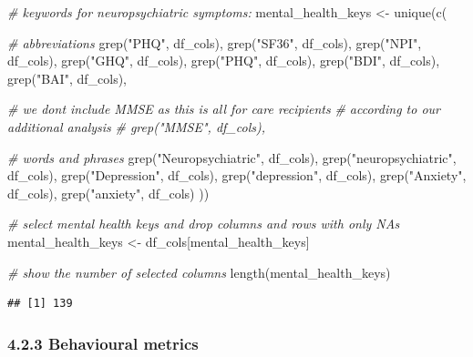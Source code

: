 \documentclass[
]{article}
\newenvironment{Shaded}{\begin{snugshade}}{\end{snugshade}}
\newcommand{\CommentTok}[1]{\textcolor[rgb]{0.56,0.35,0.01}{\textit{#1}}}
\newcommand{\FunctionTok}[1]{\textcolor[rgb]{0.00,0.00,0.00}{#1}}
\newcommand{\NormalTok}[1]{#1}
\newcommand{\OtherTok}[1]{\textcolor[rgb]{0.56,0.35,0.01}{#1}}
\newcommand{\StringTok}[1]{\textcolor[rgb]{0.31,0.60,0.02}{#1}}
\begin{document}
\begin{Shaded}
\begin{Highlighting}[]
\CommentTok{\# keywords for neuropsychiatric symptoms:}
\NormalTok{mental\_health\_keys }\OtherTok{\textless{}{-}} \FunctionTok{unique}\NormalTok{(}\FunctionTok{c}\NormalTok{(}

    \CommentTok{\# abbreviations}
    \FunctionTok{grep}\NormalTok{(}\StringTok{"PHQ"}\NormalTok{, df\_cols),}
    \FunctionTok{grep}\NormalTok{(}\StringTok{"SF36"}\NormalTok{, df\_cols),}
    \FunctionTok{grep}\NormalTok{(}\StringTok{"NPI"}\NormalTok{, df\_cols),}
    \FunctionTok{grep}\NormalTok{(}\StringTok{"GHQ"}\NormalTok{, df\_cols),}
    \FunctionTok{grep}\NormalTok{(}\StringTok{"PHQ"}\NormalTok{, df\_cols),}
    \FunctionTok{grep}\NormalTok{(}\StringTok{"BDI"}\NormalTok{, df\_cols),}
    \FunctionTok{grep}\NormalTok{(}\StringTok{"BAI"}\NormalTok{, df\_cols),}
    
    \CommentTok{\# we don\textquotesingle{}t include MMSE as this is all for care recipients}
    \CommentTok{\# according to our additional analysis}
    \CommentTok{\# grep("MMSE", df\_cols), }

    \CommentTok{\# words and phrases}
    \FunctionTok{grep}\NormalTok{(}\StringTok{"Neuropsychiatric"}\NormalTok{, df\_cols),}
    \FunctionTok{grep}\NormalTok{(}\StringTok{"neuropsychiatric"}\NormalTok{, df\_cols), }
    \FunctionTok{grep}\NormalTok{(}\StringTok{"Depression"}\NormalTok{, df\_cols),}
    \FunctionTok{grep}\NormalTok{(}\StringTok{"depression"}\NormalTok{, df\_cols),}
    \FunctionTok{grep}\NormalTok{(}\StringTok{"Anxiety"}\NormalTok{, df\_cols),}
    \FunctionTok{grep}\NormalTok{(}\StringTok{"anxiety"}\NormalTok{, df\_cols)}
\NormalTok{    ))}

\CommentTok{\# select mental health keys and drop columns and rows with only NAs}
\NormalTok{mental\_health\_keys }\OtherTok{\textless{}{-}}\NormalTok{ df\_cols[mental\_health\_keys]}

\CommentTok{\# show the number of selected columns}
\FunctionTok{length}\NormalTok{(mental\_health\_keys)}
\end{Highlighting}
\end{Shaded}

\begin{verbatim}
## [1] 139
\end{verbatim}

\hypertarget{behavioural-metrics}{%
\subsubsection{4.2.3 Behavioural metrics}\label{behavioural-metrics}}
\end{document}
